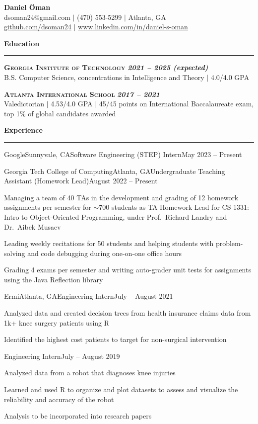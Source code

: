 \documentclass{article}
\newcommand{\horizontal}{\vspace{2pt}\hrule}
\newcommand{\school}[3]{\vspace{2pt}\textsc{\textbf{#1}} \hfill \textbf{\textit{#2}} \\ #3}
\newcommand{\sectitle}[1]{\vspace{2pt} \textbf{\large #1} \horizontal}
\begin{document}
\thispagestyle{empty}
\begin{center}
    \textbf{\LARGE Daniel Öman} \\
    dsoman24@gmail.com $|$ (470) 553-5299 $|$ Atlanta, GA \\
    \href{https://github.com/dsoman24}{github.com/dsoman24} $|$ \href{https://www.linkedin.com/in/daniel-s-oman/}{www.linkedin.com/in/daniel-s-oman}
\end{center}

\begin{flushleft}
\sectitle{Education}

\school{Georgia Institute of Technology}{2021 -- 2025 (expected)}
{B.S. Computer Science, concentrations in Intelligence and Theory $|$ 4.0/4.0 GPA}

\school{Atlanta International School}{2017 -- 2021}
{Valedictorian $|$ 4.53/4.0 GPA $|$ 45/45 points on International Baccalaureate exam, top 1\% of global candidates awarded}

\sectitle{Experience}

    \begin{experience_no_list}{Google}{Sunnyvale, CA}{Software Engineering (STEP) Intern}{May 2023 -- Present}
    \end{experience_no_list}

    \begin{experience}{Georgia Tech College of Computing}{Atlanta, GA}{Undergraduate Teaching Assistant (Homework Lead)}{August 2022 -- Present}
        \item Managing a team of 40 TAs in the development and grading of 12 homework assignments per semester for $\sim$700 students as TA Homework Lead for CS 1331: Intro to Object-Oriented Programming, under Prof.~Richard Landry and Dr.~Aibek Musaev
        \item Leading weekly recitations for 50 students and helping students with problem-solving and code debugging during one-on-one office hours
        \item Grading 4 exams per semester and writing auto-grader unit tests for assignments using the Java Reflection library
    \end{experience}

    \begin{experience}{Ermi}{Atlanta, GA}{Engineering Intern}{July -- August 2021}
        \item Analyzed data and created decision trees from health insurance claims data from 1k+ knee surgery patients using R
        \item Identified the highest cost patients to target for non-surgical intervention
    \end{experience}
    \begin{subexperience}{Engineering Intern}{July -- August 2019}
        \item Analyzed data from a robot that diagnoses knee injuries
        \item Learned and used R to organize and plot datasets to assess and visualize the reliability and accuracy of the robot
        \item Analysis to be incorporated into research papers
    \end{subexperience}


\end{flushleft}
\end{document}
